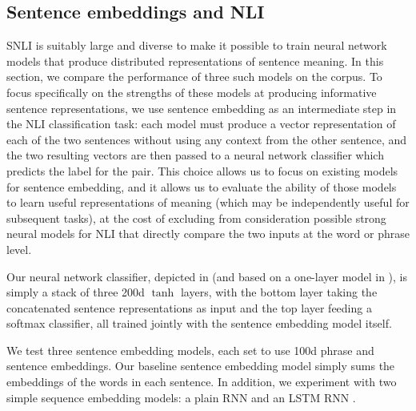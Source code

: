 
\subsection{Sentence embeddings and NLI}\label{sentence-embedding}

SNLI is suitably large and diverse to make it possible to train neural network models that produce distributed representations of sentence meaning. In this section, we compare the performance of three such models on the corpus. To focus specifically on the strengths of these models at producing informative sentence representations, we use sentence embedding as an intermediate step in the NLI classification task: each model must produce a vector representation of each of the two sentences without using any context from the other sentence, and the two resulting vectors are then passed to a neural network classifier which predicts the label for the pair. This choice allows us to focus on existing models for sentence embedding, and it allows us to evaluate the ability of those models to learn useful representations of meaning (which may be independently useful for subsequent tasks), at the cost of excluding from consideration possible strong neural models for NLI that directly compare the two inputs at the word or phrase level.



Our neural network classifier, depicted in  (and based on a one-layer model in \citealt{Bowman:Potts:Manning:2014}), is simply a stack of three 200d $\tanh$ layers, with the bottom layer taking the concatenated sentence representations as input and the top layer feeding a softmax classifier, all trained jointly with the sentence embedding model itself.

We test three sentence embedding models, each set to use 100d phrase and sentence embeddings. Our baseline sentence embedding model simply sums the embeddings of the words in each sentence. In addition, we experiment with two simple sequence embedding models: a plain RNN and an LSTM RNN \cite{hochreiter1997long}.

